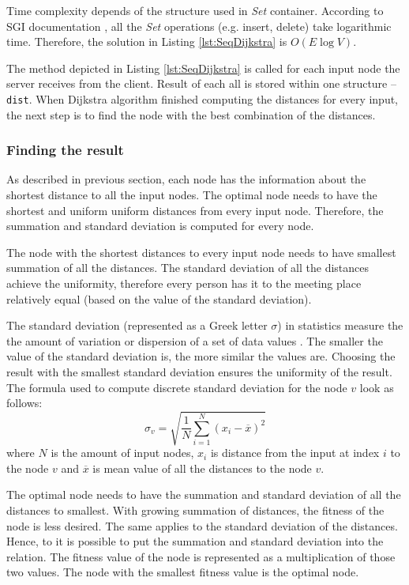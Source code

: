 \documentclass[thesis=M,english]{FITthesis}[2012/10/20]
\begin{document}
Time complexity depends of the structure used in \textit{Set} container. According to SGI documentation \cite{STL17}, all the \textit{Set} operations (e.g. insert, delete) take logarithmic time. Therefore, the solution in Listing \ref{lst:SeqDijkstra} is $O(E \log V)$.

The method depicted in Listing \ref{lst:SeqDijkstra} is called for each input node the server receives from the client. Result of each all is stored within one structure -- \texttt{dist}. When Dijkstra algorithm finished computing the distances for every input, the next step is to find the node with the best combination of the distances.

\subsubsection{Finding the result}

As described in previous section, each node has the information about the shortest distance to all the input nodes. The optimal node needs to have the shortest and uniform uniform distances from every input node. Therefore, the summation and standard deviation is computed for every node. 

The node with the shortest distances to every input node needs to have smallest summation of all the distances. The standard deviation of all the distances achieve the uniformity, therefore every person has it to the meeting place relatively equal (based on the value of the standard deviation). 

The standard deviation (represented as a Greek letter $\sigma$) in statistics measure the the amount of variation or dispersion of a set of data values \cite{Bland96}. The smaller the value of the standard deviation is, the more similar the values are. Choosing the result with the smallest standard deviation ensures the uniformity of the result.
The formula used to compute discrete standard deviation for the node $v$ look as follows:
$$
	\sigma_v = \sqrt{\frac{1}{N} \sum_{i=1}^{N} (x_i - \overline{x})^2}
$$
where $N$ is the amount of input nodes,  $x_i$ is distance from the input at index $i$ to the node $v$ and $\overline{x}$ is mean value of all the distances to the node $v$. 

The optimal node needs to have the summation and standard deviation of all the distances to smallest. With growing summation of distances, the fitness of the node is less desired. The same applies to the standard deviation of the distances. Hence, to it is possible to put the summation and standard deviation into the relation. The fitness value of the node is represented as a multiplication of those two values. The node with the smallest fitness value is the optimal node. 
\end{document}
